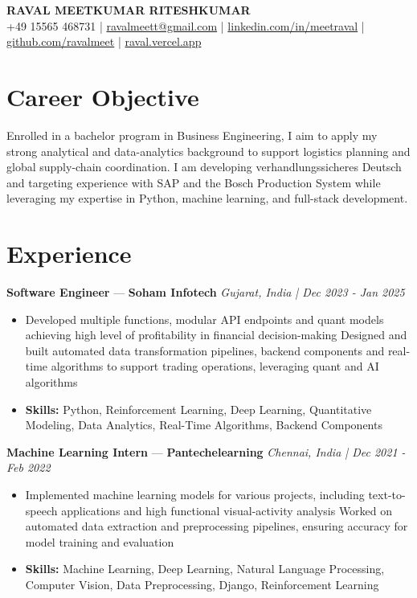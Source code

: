 \documentclass[a4paper,10pt]{article}
\begin{document}
\begin{center}
  {\Large\bfseries RAVAL MEETKUMAR RITESHKUMAR}\\[2pt]
  {\small +49 15565 468731 \;|\; \href{mailto:ravalmeett@gmail.com}{ravalmeett@gmail.com} \;|\; \href{https://www.linkedin.com/in/meetraval/}{linkedin.com/in/meetraval} \;|\; \href{https://github.com/ravalmeet}{github.com/ravalmeet} \;|\; \href{https://raval.vercel.app/}{raval.vercel.app}}
\end{center}
\vspace{-3pt}

\section*{Career Objective}
Enrolled in a bachelor program in Business Engineering, I aim to apply my strong analytical and data-analytics background to support logistics planning and global supply-chain coordination. I am developing verhandlungssicheres Deutsch and targeting experience with SAP and the Bosch Production System while leveraging my expertise in Python, machine learning, and full-stack development.\par

\section*{Experience}
\textbf{Software Engineer} — \textbf{Soham Infotech} \hfill \textit{Gujarat, India \;|\; Dec 2023 - Jan 2025}\par
\vspace{1pt}
\begin{itemize}
  \item Developed multiple functions, modular API endpoints and quant models achieving high level of profitability in financial decision-making Designed and built automated data transformation pipelines, backend components and real-time algorithms to support trading operations, leveraging quant and AI algorithms
  \item \textbf{Skills:} Python, Reinforcement Learning, Deep Learning, Quantitative Modeling, Data Analytics, Real-Time Algorithms, Backend Components
\end{itemize}
\vspace{3pt}
\textbf{Machine Learning Intern} — \textbf{Pantechelearning} \hfill \textit{Chennai, India \;|\; Dec 2021 - Feb 2022}\par
\vspace{1pt}
\begin{itemize}
  \item Implemented machine learning models for various projects, including text-to-speech applications and high functional visual-activity analysis Worked on automated data extraction and preprocessing pipelines, ensuring accuracy for model training and evaluation
  \item \textbf{Skills:} Machine Learning, Deep Learning, Natural Language Processing, Computer Vision, Data Preprocessing, Django, Reinforcement Learning
\end{itemize}
\end{document}
